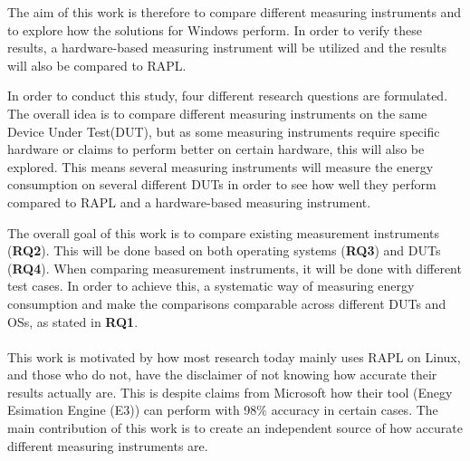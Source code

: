 The aim of this work is therefore to compare different measuring instruments and to explore how the solutions for Windows perform. 
In order to verify these results, a hardware-based measuring instrument will be utilized and the results will also be compared to RAPL.

In order to conduct this study, four different research questions are formulated. The overall idea is to compare different measuring instruments on the same Device Under Test(DUT), but as some measuring instruments require specific hardware or claims to perform better on certain hardware, this will also be explored. This means several measuring instruments will measure the energy consumption on several different DUTs in order to see how well they perform compared to RAPL and a hardware-based measuring instrument.



The overall goal of this work is to compare existing measurement instruments (\textbf{RQ2}). This will be done based on both operating systems (\textbf{RQ3}) and DUTs (\textbf{RQ4}). When comparing measurement instruments, it will be done with different test cases. In order to achieve this, a systematic way of measuring energy consumption and make the comparisons comparable across different DUTs and OSs, as stated in \textbf{RQ1}.

\paragraph*{}
This work is motivated by how most research today mainly uses RAPL on Linux\cite[]{Rasmussen2021,Pereira2017,Theilmann2022,Lindholt2022}, and those who do not, have the disclaimer of not knowing how accurate their results actually are\cite[]{Bruce2015ReducingEC, Ozturk2019, Unlu2021}. This is despite claims from Microsoft how their tool (Enegy Esimation Engine (E3)) can perform with 98\% accuracy in certain cases\cite[]{E3WinHec}. The main contribution of this work is to create an independent source of how accurate different measuring instruments are.

